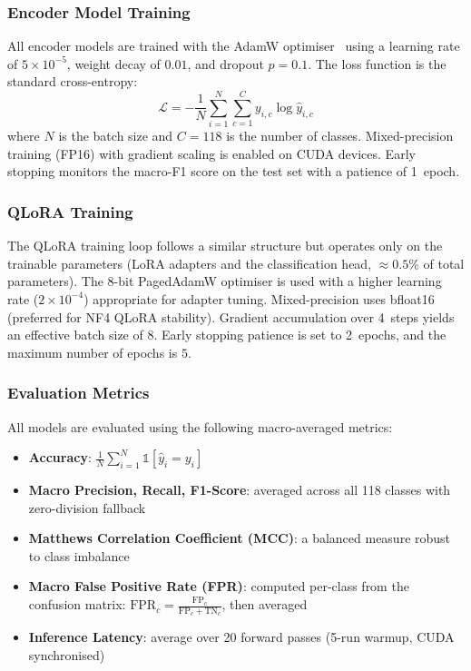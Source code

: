 \documentclass[conference]{IEEEtran}
\begin{document}
\subsubsection{Encoder Model Training}
All encoder models are trained with the AdamW optimiser~\cite{loshchilov2019decoupled} using a learning
rate of $5 \times 10^{-5}$, weight decay of $0.01$, and dropout
$p = 0.1$.  The loss function is the standard cross-entropy:
\begin{equation}
    \mathcal{L} = -\frac{1}{N}\sum_{i=1}^{N}\sum_{c=1}^{C}
        y_{i,c} \log \hat{y}_{i,c}
\label{eq:ce_loss}
\end{equation}
where $N$ is the batch size and $C = 118$ is the number of classes.
Mixed-precision training (FP16) with gradient scaling is enabled on CUDA
devices.  Early stopping monitors the macro-F1 score on the test set with a
patience of 1~epoch.

\subsubsection{QLoRA Training}
The QLoRA training loop follows a similar structure but operates only on
the trainable parameters (LoRA adapters and the classification head,
$\approx\!0.5\%$ of total parameters).  The 8-bit PagedAdamW optimiser
is used with a higher learning rate ($2 \times 10^{-4}$) appropriate for
adapter tuning.  Mixed-precision uses bfloat16 (preferred for NF4 QLoRA
stability).  Gradient accumulation over 4~steps yields an effective batch
size of $8$.  Early stopping patience is set to 2~epochs, and the maximum
number of epochs is $5$.

\subsubsection{Evaluation Metrics}
All models are evaluated using the following macro-averaged metrics:
\begin{itemize}
    \item \textbf{Accuracy}: $\frac{1}{N}\sum_{i=1}^{N}
          \mathbb{1}[\hat{y}_i = y_i]$
    \item \textbf{Macro Precision, Recall, F1-Score}: averaged
          across all 118 classes with zero-division fallback
    \item \textbf{Matthews Correlation Coefficient (MCC)}: a balanced
          measure robust to class imbalance
    \item \textbf{Macro False Positive Rate (FPR)}: computed per-class
          from the confusion matrix:
          $\text{FPR}_c = \frac{\text{FP}_c}{\text{FP}_c + \text{TN}_c}$,
          then averaged
    \item \textbf{Inference Latency}: average over 20 forward passes
          (5-run warmup, CUDA synchronised)
\end{itemize}
\end{document}
